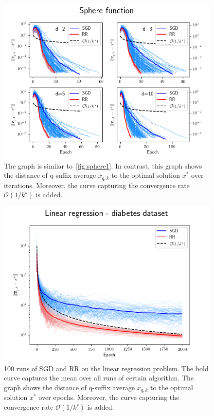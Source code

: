 \documentclass[10pt,conference,compsocconf]{IEEEtran}
\begin{document}
\begin{figure}[h]
  \centering
  \includegraphics[width=\columnwidth]{Square_runs_average}
  \caption{The graph is similar to~\ref{fig:sphere1}.
  In contrast, this graph shows the distance of q-suffix average
  $\overline{x}_{q,k}$ to the optimal solution $x^*$ over iterations.
  Moreover, the curve capturing the convergence rate
  $\mathcal{O}(1 / k^s)$ is added.}
  \vspace{-3mm}
  \label{fig:squareav1}
\end{figure}

\begin{figure}[h]
  \centering
  \includegraphics[width=\columnwidth]{LeastSquares_runs_average}
  \caption{100 runs of SGD and RR on the linear regression problem.
   The bold curve captures the mean over all runs of certain algorithm.
   The graph shows the distance of q-suffix average
   $\overline{x}_{q,k}$ to the optimal solution $x^*$ over
   epochs. Moreover, the curve capturing the convergence rate
   $\mathcal{O}(1 / k^s)$ is added.}
  \vspace{-3mm}
  \label{fig:leastsquares1}
\end{figure}
\end{document}
